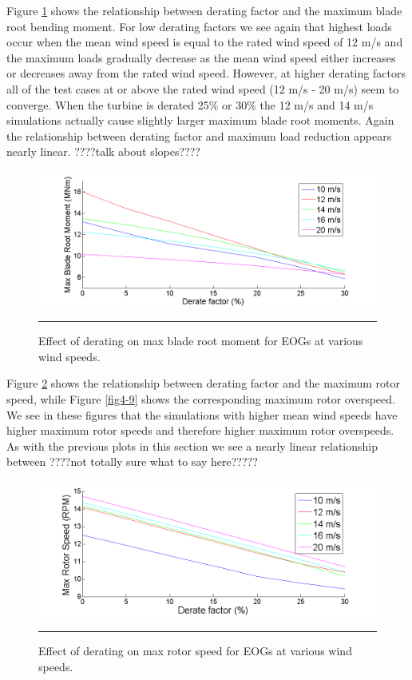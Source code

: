 Figure \ref{fig4-7} shows the relationship between derating factor and the maximum blade root bending moment. For low derating factors we see again that highest loads occur when the mean wind speed is equal to the rated wind speed of 12 m/s and the maximum loads gradually decrease as the mean wind speed either increases or decreases away from the rated wind speed. However, at higher derating factors all of the test cases at or above the rated wind speed (12 m/s - 20 m/s) seem to converge. When the turbine is derated 25\% or 30\% the 12 m/s and 14 m/s simulations actually cause slightly larger maximum blade root moments. Again the relationship between derating factor and maximum load reduction appears nearly linear. ????talk about slopes????

\begin{figure}[htbp]
	\centering
		\includegraphics[trim = {1cm 0 2cm 0}, clip, width = \linewidth]{Figures/ch4Figures/fig4-7.png}
		\rule{35em}{0.5pt}
	\caption{Effect of derating on max blade root moment for EOGs at various wind speeds.}
	\label{fig4-7}
\end{figure}

Figure \ref{fig4-8} shows the relationship between derating factor and the maximum rotor speed, while Figure \ref{fig4-9} shows the corresponding maximum rotor overspeed. We see in these figures that the simulations with higher mean wind speeds have higher maximum rotor speeds and therefore higher maximum rotor overspeeds. As with the previous plots in this section we see a nearly linear relationship between ????not totally sure what to say here?????

\begin{figure}[htbp]
	\centering
		\includegraphics[trim = {1cm 0 2cm 0}, clip, width = \linewidth]{Figures/ch4Figures/fig4-8.png}
		\rule{35em}{0.5pt}
	\caption{Effect of derating on max rotor speed for EOGs at various wind speeds.}
	\label{fig4-8}
\end{figure}

